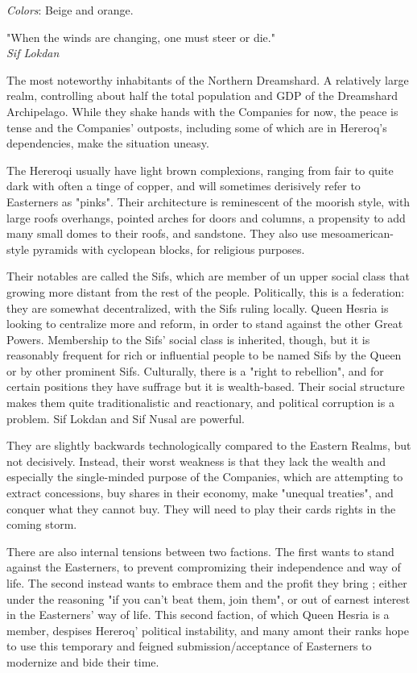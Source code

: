 \textit{Colors}: Beige and orange.


\begin{rpg-quotebox}
    "When the winds are changing, one must steer or die." \\ \textendash \textit{Sif Lokdan}
\end{rpg-quotebox}


The most noteworthy inhabitants of the Northern Dreamshard. A relatively large realm, controlling about half the total population and GDP of the Dreamshard Archipelago. While they shake hands with the Companies for now, the peace is tense and the Companies' outposts, including some of which are in Hereroq's dependencies, make the situation uneasy.

The Hereroqi usually have light brown complexions, ranging from fair to quite dark with often a tinge of copper, and will sometimes derisively refer to Easterners as "pinks". Their architecture is reminescent of the moorish style, with large roofs overhangs, pointed arches for doors and columns, a propensity to add many small domes to their roofs, and sandstone. They also use mesoamerican-style pyramids with cyclopean blocks, for religious purposes.

Their notables are called the Sifs, which are member of un upper social class that growing more distant from the rest of the people. Politically, this is a federation: they are somewhat decentralized, with the Sifs ruling locally. Queen Hesria is looking to centralize more and reform, in order to stand against the other Great Powers. Membership to the Sifs' social class is inherited, though, but it is reasonably frequent for rich or influential people to be named Sifs by the Queen or by other prominent Sifs. Culturally, there is a "right to rebellion", and for certain positions they have suffrage but it is wealth-based. Their social structure makes them quite traditionalistic and reactionary, and political corruption is a problem. Sif Lokdan and Sif Nusal are powerful.

They are slightly backwards technologically compared to the Eastern Realms, but not decisively. Instead, their worst weakness is that they lack the wealth and especially the single-minded purpose of the Companies, which are attempting to extract concessions, buy shares in their economy, make "unequal treaties", and conquer what they cannot buy. They will need to play their cards rights in the coming storm. 

There are also internal tensions between two factions. The first wants to stand against the Easterners, to prevent compromizing their independence and way of life. The second instead wants to embrace them and the profit they bring ; either under the reasoning "if you can't beat them, join them", or out of earnest interest in the Easterners' way of life. This second faction, of which Queen Hesria is a member, despises Hereroq' political instability, and many amont their ranks hope to use this temporary and feigned submission/acceptance of Easterners to modernize and bide their time.

